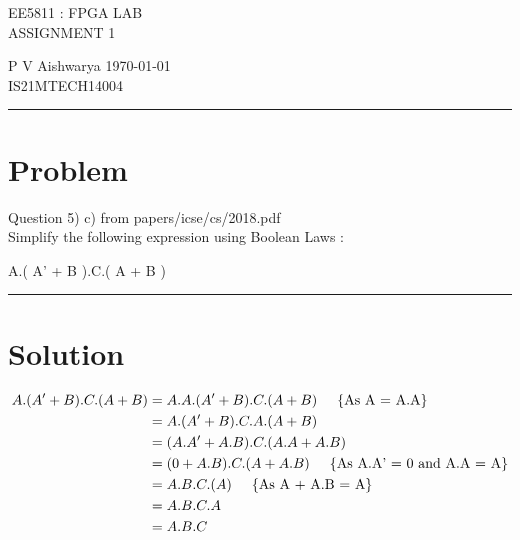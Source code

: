 \documentclass[10pt,a4paper]{article}
\begin{document}
\begin{center}

{\huge EE5811 : FPGA LAB}\\
{\large ASSIGNMENT 1}

\end{center}
P V Aishwarya \hfill \today \\ IS21MTECH14004

\vspace{15pt}
\hrule
\vspace{5pt}


\section*{Problem}

Question 5) c) from papers/icse/cs/2018.pdf\\
Simplify the following expression using Boolean Laws :

\begin{center}
    A.( A' + B ).C.( A + B )
\end{center}

\vspace{15pt}
\hrule
\vspace{5pt}

\section*{Solution}

\begin{align}
     A.( A' + B ).C.( A + B ) 
    \vspace{5pt}
    &= A.A.( A' + B ).C.( A + B )\hspace{0.5cm}\{\text{As A = A.A}\}\\
    \vspace{5pt}
    &= A.( A' + B ).C.A.( A + B )\\
    \vspace{5pt}
    &= ( A.A' + A.B ).C.( A.A + A.B )\\
     \vspace{5pt}
     &= ( 0 + A.B ).C.( A + A.B )\hspace{0.5cm}\{\text{As A.A' = 0 and A.A = A}\}\\
    \vspace{5pt}
    &= A.B.C.( A )\hspace{0.5cm}\{\text{As A + A.B = A}\}\\ 
    \vspace{5pt}
    &= A.B.C.A\\
    \vspace{5pt}
    &= A.B.C
\end{align}
   
\end{document}
